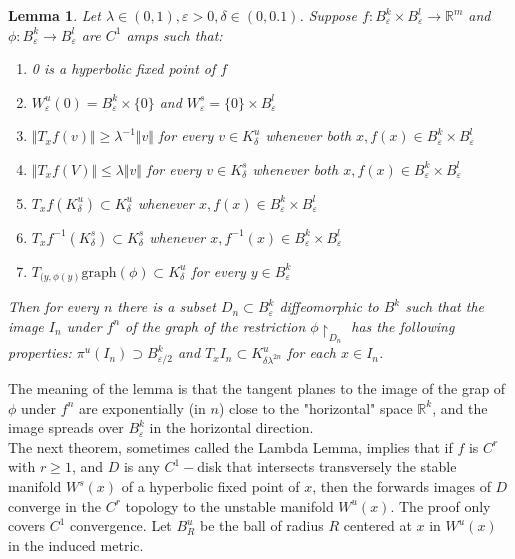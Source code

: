 \documentclass{article}
\newtheorem{lem}{Lemma}
\begin{document}
\begin{lem}

Let $\lambda \in (0,1), \varepsilon >0, \delta \in (0,0.1)$. Suppose $f: B^k_{\varepsilon} \times B^l_{\varepsilon} \to \mathbb{R}^m$ and $\phi: B^k_{\varepsilon} \to B^l_{\varepsilon}$ are $C^1$ amps such that:

\begin{enumerate}
    \item 0 is a hyperbolic fixed point of $f$
    \item $W^u_{\varepsilon}(0) = B^k_{\varepsilon} \times \{0\}$ and $W^s_{\varepsilon} = \{0 \} \times B^l_{\varepsilon}$
    \item $\Vert T_xf(v) \Vert \geq \lambda^{-1} \Vert v \Vert$ for every $v \in K^u_{\delta}$ whenever both $x, f(x) \in B^k_{\varepsilon} \times B^l_{\varepsilon}$
    \item $\Vert T_xf (V) \Vert \leq \lambda \Vert v \Vert$ for every $v \in K^s_{\delta}$ whenever both $x, f(x) \in B^k_{\varepsilon} \times B^l_{\varepsilon}$
    \item $T_xf(K^u_{\delta}) \subset K^u_{\delta}$ whenever $x, f(x) \in B^k_{\varepsilon} \times B^l_{\varepsilon}$
    \item $T_xf^{-1} (K^s_{\delta}) \subset K^s_{\delta}$ whenever $x, f^{-1}(x) \in B^k_{\varepsilon} \times B^l_{\varepsilon}$
    \item $T_{(y,\phi(y)}\mathrm{graph}(\phi) \subset K^u_{\delta}$ for every $y \in B^k_{\varepsilon}$
\end{enumerate}

Then for every $n$ there is a subset $D_n \subset B^k_{\varepsilon}$ diffeomorphic to $B^k$ such that the image $I_n$ under $f^n$ of the graph of the restriction $\phi \restriction_{D_n}$ has the following properties: $\pi^u(I_n) \supset B^k_{\varepsilon /2}$ and $T_xI_n \subset K^u_{\delta \lambda^{2n}}$ for each $x \in I_n$.
\end{lem}

The meaning of the lemma is that the tangent planes to the image of the grap of $\phi$ under $f^n$ are exponentially (in $n$) close to the "horizontal" space $\mathbb{R}^k$, and the image spreads over $B^k_{\varepsilon}$ in the horizontal direction. \\
\indent The next theorem, sometimes called the Lambda Lemma, implies that if $f$ is $C^r$ with $r \geq 1$, and $D$ is any $C^1-$disk that intersects transversely the stable manifold $W^s(x)$ of a hyperbolic fixed point of $x$, then the forwards images of $D$ converge in the $C^r$ topology to the unstable manifold $W^u(x)$. The proof only covers $C^1$ convergence. Let $B^u_R$ be the ball of radius $R$ centered at $x$ in $W^u(x)$ in the induced metric. \\
\end{document}
